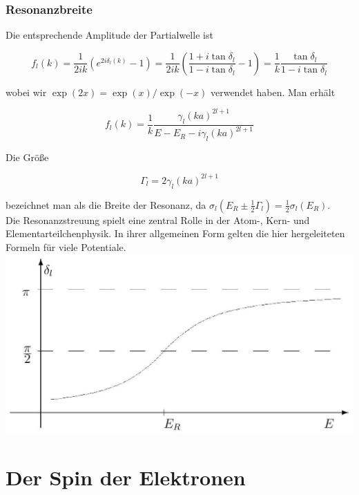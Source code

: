 \documentclass[10pt, letterpaper]{article}
\begin{document}
\subsubsection*{Resonanzbreite}
Die entsprechende Amplitude der Partialwelle ist

$$
f_{l}(k)=\frac{1}{2 i k}\left(e^{2 i \delta_{l}(k)}-1\right)=\frac{1}{2 i k}\left(\frac{1+i \tan \delta_{l}}{1-i \tan \delta_{l}}-1\right)=\frac{1}{k} \frac{\tan \delta_{l}}{1-i \tan \delta_{l}}
$$

wobei wir $\exp (2 x)=\exp (x) / \exp (-x)$ verwendet haben. Man erhält

$$
f_{l}(k)=\frac{1}{k} \frac{\gamma_{l}(k a)^{2 l+1}}{E-E_{R}-i \gamma_{l}(k a)^{2 l+1}}
$$

Die Größe

$$
\Gamma_{l}=2 \gamma_{l}(k a)^{2 l+1}
$$

bezeichnet man als die Breite der Resonanz, da $\sigma_{l}\left(E_{R} \pm \frac{1}{2} \Gamma_{l}\right)=\frac{1}{2} \sigma_{l}\left(E_{R}\right)$.\\
Die Resonanzstreuung spielt eine zentral Rolle in der Atom-, Kern- und Elementarteilchenphysik. In ihrer allgemeinen Form gelten die hier hergeleiteten Formeln für viele Potentiale.\\
\includegraphics[scale=0.2, center]{2025_05_21_d5590f158a899e385c7cg-22}

















\pagebreak

\section{Der Spin der Elektronen}
\end{document}

